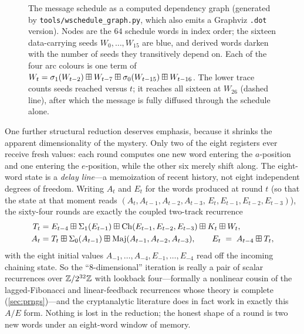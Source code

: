 \begin{figure}[ht]
  \centering
  \resizebox{\linewidth}{!}{}
  \caption{The message schedule as a computed dependency graph
  (generated by \texttt{tools/wschedule\_graph.py}, which also emits a
  Graphviz \texttt{.dot} version). Nodes are the $64$ schedule words in
  index order; the sixteen data-carrying seeds $W_0,\dots,W_{15}$ are
  blue, and derived words darken with the number of seeds they
  transitively depend on. Each of the four arc colours is one term of
  $W_t=\sigma_1(W_{t-2})\boxplus W_{t-7}\boxplus\sigma_0(W_{t-15})\boxplus
  W_{t-16}$. The lower trace counts seeds reached versus $t$; it reaches
  all sixteen at $W_{26}$ (dashed line), after which the message is fully
  diffused through the schedule alone.}
  \label{fig:schedulegraph}
\end{figure}

One further structural reduction deserves emphasis, because it shrinks
the apparent dimensionality of the mystery. Only two of the eight
registers ever receive fresh values: each round computes one new word
entering the $a$-position and one entering the $e$-position, while the
other six merely shift along. The eight-word state is a \emph{delay
line}---a memoization of recent history, not eight independent degrees
of freedom. Writing $A_t$ and $E_t$ for the words produced at round $t$
(so that the state at that moment reads
$(A_t, A_{t-1}, A_{t-2}, A_{t-3},\, E_t, E_{t-1}, E_{t-2}, E_{t-3})$),
the sixty-four rounds are exactly the coupled two-track recurrence
\begin{align*}
  T_t &= E_{t-4} \boxplus \Sigma_1(E_{t-1})
        \boxplus \mathrm{Ch}(E_{t-1}, E_{t-2}, E_{t-3})
        \boxplus K_t \boxplus W_t,\\
  A_t &= T_t \boxplus \Sigma_0(A_{t-1})
        \boxplus \mathrm{Maj}(A_{t-1}, A_{t-2}, A_{t-3}),
  \qquad
  E_t \;=\; A_{t-4} \boxplus T_t,
\end{align*}
with the eight initial values $A_{-1}, \dots, A_{-4}, E_{-1}, \dots,
E_{-4}$ read off the incoming chaining state. So the ``$8$-dimensional''
iteration is really a pair of scalar recurrences over $\mathbb{Z}/2^{32}\mathbb{Z}$ with
lookback four---formally a nonlinear cousin of the lagged-Fibonacci and
linear-feedback recurrences whose theory is complete
(\cref{sec:prngs})---and the cryptanalytic literature does in fact work
in exactly this $A/E$ form. Nothing is lost in the reduction; the honest
shape of a round is two new words under an eight-word window of memory.

